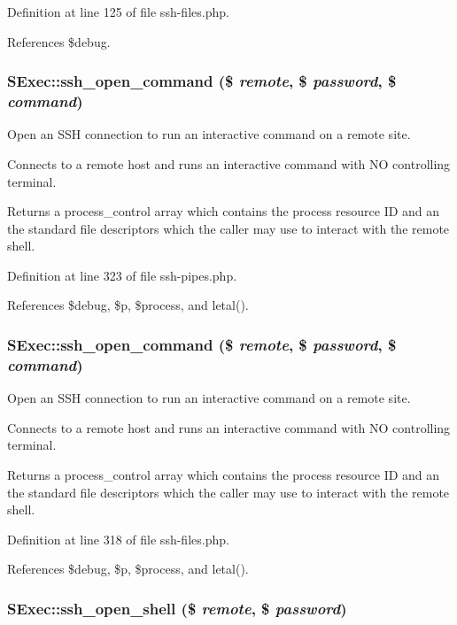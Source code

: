 Definition at line 125 of file ssh-files.php.

References \$debug.
\subsubsection{\setlength{\rightskip}{0pt plus 5cm}SExec::ssh\_\-open\_\-command (\$ {\em remote}, \$ {\em password}, \$ {\em command})}\label{classSExec_a17}


Open an SSH connection to run an interactive command on a remote site. 

Connects to a remote host and runs an interactive command with NO controlling terminal.

Returns a process\_\-control array which contains the process resource ID and an the standard file descriptors which the caller may use to interact with the remote shell. 

Definition at line 323 of file ssh-pipes.php.

References \$debug, \$p, \$process, and letal().
\subsubsection{\setlength{\rightskip}{0pt plus 5cm}SExec::ssh\_\-open\_\-command (\$ {\em remote}, \$ {\em password}, \$ {\em command})}\label{classSExec_a6}


Open an SSH connection to run an interactive command on a remote site. 

Connects to a remote host and runs an interactive command with NO controlling terminal.

Returns a process\_\-control array which contains the process resource ID and an the standard file descriptors which the caller may use to interact with the remote shell. 

Definition at line 318 of file ssh-files.php.

References \$debug, \$p, \$process, and letal().
\subsubsection{\setlength{\rightskip}{0pt plus 5cm}SExec::ssh\_\-open\_\-shell (\$ {\em remote}, \$ {\em password})}\label{classSExec_a16}


